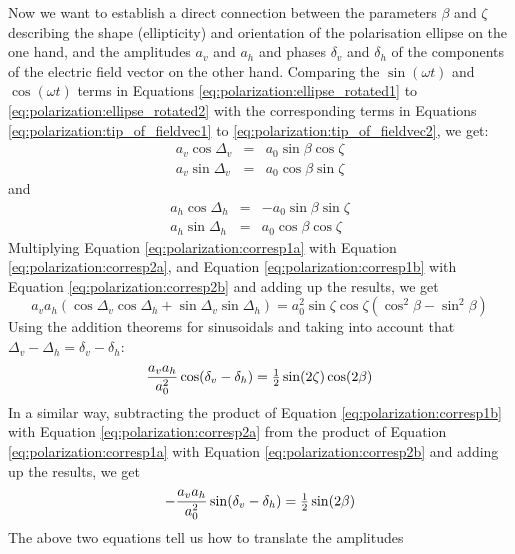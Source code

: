 Now we want to establish a direct connection between the parameters
$\beta$ and $\zeta$ describing the shape (ellipticity) and orientation
of the polarisation ellipse on the one hand, and the amplitudes $a_v$
and $a_h$ and phases $\delta_v$ and $\delta_h$ of the components of
the electric field vector on the other hand.  Comparing the
$\sin(\omega t)$ and $\cos(\omega t)$ terms in
Equations \ref{eq:polarization:ellipse_rotated1} to
\ref{eq:polarization:ellipse_rotated2} with the corresponding terms
in Equations \ref{eq:polarization:tip_of_fieldvec1} to
\ref{eq:polarization:tip_of_fieldvec2}, we get:
\begin{eqnarray}
  \label{eq:polarization:corresp1a}
 a_v \cos\Delta_v &=& a_0 \sin\beta \cos\zeta\\
  \label{eq:polarization:corresp1b}
 a_v \sin\Delta_v &=& a_0 \cos\beta \sin\zeta
\end{eqnarray}
and 
\begin{eqnarray}
  \label{eq:polarization:corresp2a}
 a_h \cos\Delta_h &=& -a_0 \sin\beta \sin\zeta\\
  \label{eq:polarization:corresp2b}
 a_h \sin\Delta_h &=&  a_0 \cos\beta \cos\zeta
\end{eqnarray}
Multiplying Equation \ref{eq:polarization:corresp1a} with
Equation \ref{eq:polarization:corresp2a}, and
Equation \ref{eq:polarization:corresp1b} with
Equation \ref{eq:polarization:corresp2b} and adding up the results, we get
\begin{equation}
  a_v a_h (\cos\Delta_v\cos\Delta_h + \sin\Delta_v\sin\Delta_h)
  = a_0^2 \sin\zeta\cos\zeta (\cos^2\beta - \sin^2\beta) 
\end{equation}
Using the addition theorems for sinusoidals and taking into account
that
$\Delta_v-\Delta_h = \delta_v-\delta_h$:
\begin{equation}
  \label{eq:polarization:sinzetacosbeta}
  \frac{a_v a_h}{a_0^2} \cos(\delta_v-\delta_h)
  = \textstyle\frac{1}{2}\sin(2\zeta)\cos(2\beta)
\end{equation}
In a similar way, subtracting the product of
Equation \ref{eq:polarization:corresp1b} with
Equation \ref{eq:polarization:corresp2a} from the product of
Equation \ref{eq:polarization:corresp1a} with
Equation \ref{eq:polarization:corresp2b} and adding up the results, we get
\begin{equation}
  \label{eq:polarization:sinbeta}
  -\frac{a_v a_h}{a_0^2} \sin(\delta_v-\delta_h)
  = \textstyle\frac{1}{2}\sin(2\beta)
\end{equation}
The above two equations tell us how to translate the amplitudes

